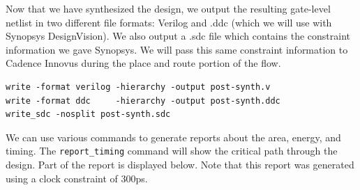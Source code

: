 \documentclass[a4paper,12pt,twoside]{article}
\begin{document}
Now that we have synthesized the design, we output the resulting gate-level netlist in two different file formats: Verilog and .ddc (which we will use with Synopsys DesignVision). We also output a .sdc file which contains the constraint information we gave Synopsys. We will pass this same constraint information to Cadence Innovus during the place and route portion of the flow.
\begin{verbatim}
write -format verilog -hierarchy -output post-synth.v
write -format ddc     -hierarchy -output post-synth.ddc
write_sdc -nosplit post-synth.sdc
\end{verbatim}
We can use various commands to generate reports about the area, energy, and timing. The \texttt{report\_timing} command will show the critical path through the design. Part of the report is displayed below. Note that this report was generated using a clock constraint of 300ps.
\end{document}
